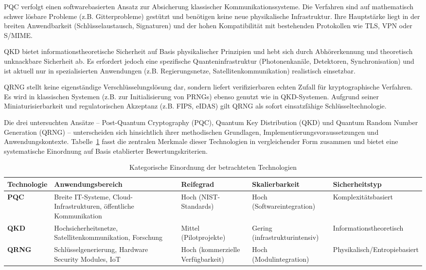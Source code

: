 PQC verfolgt einen softwarebasierten Ansatz zur Absicherung klassischer Kommunikationssysteme. Die Verfahren sind auf mathematisch schwer lösbare Probleme (z.B. Gitterprobleme) gestützt und benötigen keine neue physikalische Infrastruktur. Ihre Hauptstärke liegt in der breiten Anwendbarkeit (Schlüsselaustausch, Signaturen) und der hohen Kompatibilität mit bestehenden Protokollen wie TLS, VPN oder S/MIME.

QKD bietet informationstheoretische Sicherheit auf Basis physikalischer Prinzipien und hebt sich durch Abhörerkennung und theoretisch unknackbare Sicherheit ab. Es erfordert jedoch eine spezifische Quanteninfrastruktur (Photonenkanäle, Detektoren, Synchronisation) und ist aktuell nur in spezialisierten Anwendungen (z.B. Regierungsnetze, Satellitenkommunikation) realistisch einsetzbar.

QRNG stellt keine eigenständige Verschlüsselungslösung dar, sondern liefert verifizierbaren echten Zufall für kryptographische Verfahren. Es wird in klassischen Systemen (z.B. zur Initialisierung von PRNGs) ebenso genutzt wie in QKD-Systemen. Aufgrund seiner Miniaturisierbarkeit und regulatorischen Akzeptanz (z.B. FIPS, eIDAS) gilt QRNG als sofort einsatzfähige Schlüsseltechnologie.


Die drei untersuchten Ansätze – Post-Quantum Cryptography (PQC), Quantum Key Distribution (QKD) und Quantum Random Number Generation (QRNG) – unterscheiden sich hinsichtlich ihrer methodischen Grundlagen, Implementierungsvoraussetzungen und Anwendungskontexte. Tabelle~\ref{tab:kategorische_einordnung} fasst die zentralen Merkmale dieser Technologien in vergleichender Form zusammen und bietet eine systematische Einordnung auf Basis etablierter Bewertungskriterien.

\begin{table}[htbp]
\centering
\caption{Kategorische Einordnung der betrachteten Technologien}
\label{tab:kategorische_einordnung}
\begin{tabular}{@{}p{3cm}p{4.2cm}p{2.8cm}p{2.8cm}p{3.2cm}@{}}
\toprule
\textbf{Technologie} & \textbf{Anwendungsbereich} & \textbf{Reifegrad} & \textbf{Skalierbarkeit} & \textbf{Sicherheitstyp} \\
\midrule
\textbf{PQC} & Breite IT-Systeme, Cloud-Infrastrukturen, öffentliche Kommunikation & Hoch (NIST-Standards) & Hoch (Softwareintegration) & Komplexitätsbasiert \\
\textbf{QKD} & Hochsicherheitsnetze, Satellitenkommunikation, Forschung & Mittel (Pilotprojekte) & Gering (infrastrukturintensiv) & Informationstheoretisch \\
\textbf{QRNG} & Schlüsselgenerierung, Hardware Security Modules, IoT & Hoch (kommerzielle Verfügbarkeit) & Hoch (Modulintegration) & Physikalisch/Entropiebasiert \\
\bottomrule
\end{tabular}
\end{table}

